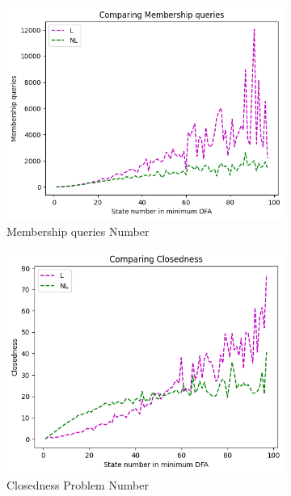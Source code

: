 \begin{figure}[!htb]
  \begin{subfigure}[b]{0.3\textwidth}
    \includegraphics[width=\textwidth]{../statistics/plots/BenchMark/Membership queries.png}
    \caption{Membership queries Number}
    \label{fig:MemberBenchMarkCompare}
  \end{subfigure}
  \begin{subfigure}[b]{0.3\textwidth}
    \includegraphics[width=\textwidth]{../statistics/plots/BenchMark/Closedness.png}
    \caption{Closedness Problem Number}
    \label{fig:ClosednessBenchMarkCompare}
  \end{subfigure}
  \begin{subfigure}[b]{0.3\textwidth}

\end{subfigure}
\end{figure}
